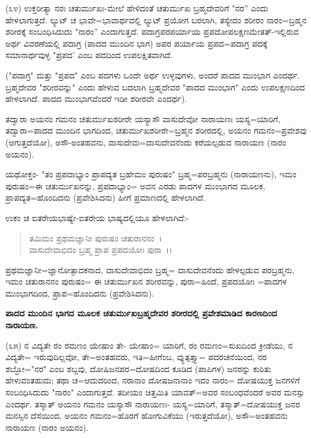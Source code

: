 (೩೪) ಉಕ್ತರೀತ್ಯಾ ನರಃ ಚತುರ್ಮುಖಃ-ಮೇಲೆ ಹೇಳಿದಂತೆ ಚತುರ್ಮುಖ ಬ್ರಹ್ಮದೇವರಿಗೆ "ನರ'' ಎಂದು ಹೇಳಲಾಗುತ್ತದೆ. ಲ್ಯುಟ್ ಚ ಭಾವೇ=ಭಾವಾರ್ಥದಲ್ಲಿ ಲ್ಯುಟ್ ಪ್ರಯೋಗ ಬರಲಾಗಿ, ತಸ್ಯೇದಂ ಶರೀರಂ ನಾರಂ=ಬ್ರಹ್ಮನ ಶರೀರಕ್ಕೆ ಸಂಬಂಧಿಸಿದುದು "ನಾರಂ'' ಎಂದಾಗುತ್ತದೆ. ಪದಾಗ್ರಪರಪರ್ಯಾಯ ಪ್ರಪದೋಪಲಕ್ಷಣಮೇತತ್-ಇಲ್ಲಿರುವ ಅರ್ಥ ವಿವರಣೆಯಲ್ಲಿ ಪದಾಗ್ರ (ಪಾದದ ಮುಂದಿನ ಭಾಗ) ಅಪರ ಪರ್ಯಾಯ ಪ್ರಪದ=ಪದಾಗ್ರ ಪದಕ್ಕೆ ಸಮಾನಾರ್ಥವುಳ್ಳ "ಪ್ರಪದ' ಎಂಬ ಪದದಿಂದ ಉಪಲಕ್ಷಿತವಾಗಿದೆ.

("ಪದಾಗ್ರ" ಮತ್ತು "ಪ್ರಪದ" ಎಂಬ ಪದಗಳು ಒಂದೇ ಅರ್ಥ ಉಳ್ಳವುಗಳು, ಅಂದರೆ ಪಾದದ ಮುಂಭಾಗ ಎಂದರ್ಥ. ಬ್ರಹ್ಮದೇವರ "ಶರೀರವನ್ನು" ಎಂದು ಹೇಳುವ ಬದಲಾಗಿ ಬ್ರಹ್ಮದೇವರ "ಪಾದದ ಮುಂಭಾಗ" ಎಂದು ಉಪಲಕ್ಷಣದಿಂದ ಹೇಳಲಾಗಿದೆ. ಪಾದದ ಮುಂಭಾಗವೆಂದರೆ ಇಡೀ ಶರೀರವೇ ಎಂದರ್ಥ).

ತದ್ವಾರಾ ಅಯನಂ ಗಮನಂ ಚತುರ್ಮುಖಶರೀರೇ ಯಸ್ಯಾಸೌ ವಾಸುದೇವೋ ನಾರಾಯಣಃ ಯಸ್ಯ=ಯಾರಿಗೆ, ತದ್ವಾರಾ=ಪಾದದ ಮುಂದಿನ ಭಾಗದಿಂದ, ಚತುರ್ಮುಖಶರೀರೇ=ಬ್ರಹ್ಮನ ಶರೀರದಲ್ಲಿ, ಅಯನಂ ಗಮನಂ=ಪ್ರವೇಶವು (ಆಗುತ್ತದೆಯೋ), ಅಸೌ-ಅಂತಹವನು, ವಾಸುದೇವಃ=ವಾಸುದೇವನೆಂದು ಕರೆಯಲ್ಪಡುವ ನಾರಾಯಣ (ನಾರಂ ಅಯನಂ).

ಯಥೋಕ್ತಂ- "ತಂ ಪ್ರಪದಾಭ್ಯಾಂ ಪ್ರಾಪದ್ಯತ ಬ್ರಹೇಮಂ ಪುರುಷಂ" ಬ್ರಹ್ಮ=ಪರಬ್ರಹ್ಮನು (ನಾರಾಯಣನು), ಇಮಂ ಪುರುಷಂ=ಈ ಚತುರ್ಮುಖನನ್ನು, ಪ್ರಪದಾಭ್ಯಾಂ= ಅವನ ಎರಡು ಪಾದಗಳ ಮುಂಭಾಗದ ಮೂಲಕ, ಪ್ರಾಪದ್ಯತ=ಹೊಂದಿದನು (ಪ್ರವೇಶಿಸಿದನು) ಹೀಗೆ ಪ್ರಮಾಣದಲ್ಲಿ ಹೇಳಲಾಗಿದೆ.

ಉಕಂ ಚ ಐತರೇಯಭಾಷ್ಯೇ-ಐತರೇಯ ಭಾಷ್ಯದಲ್ಲಿಯೂ ಹೇಳಲಾಗಿದೆ:-

\begin{verse}
ತಮಿಮಂ ಪ್ರಥಮಜ್ಞಾನೀ ಪುರುಷಂ ಚತುರಾನನಂ~।\\ ವಾಸುದೇವಾಭಿದಂ ಬ್ರಹ್ಮ ಪ್ರಾಪ ಪ್ರಪದಯೋಃ ಪುರಾ~।।
\end{verse}

ಪ್ರಥಮಜ್ಞಾನೀ=ಜ್ಞಾನೋತ್ಪಾದಕನಾದ, ವಾಸುದೇವಾಭಿದಂ ಬ್ರಹ್ಮ= ವಾಸುದೇವನೆಂದು ಹೇಳಲ್ಪಡುವ ಪರಬ್ರಹ್ಮನು, ಇಮಂ ಚತುರಾನನಂ ಪುರುಷಂ= ಈ ಚತುರ್ಮುಖನ ಶರೀರವನ್ನು, ಪುರಾ=ಹಿಂದೆ, ಪ್ರಪದಯೋಃ =ಪಾದಗಳ ಮುಂಭಾಗದಿಂದ, ಪ್ರಾಪ=ಹೊಂದಿದನು (ಪ್ರವೇಶಿಸಿದನು).

\begin{center}
\textbf{ಪಾದದ ಮುಂದಿನ ಭಾಗದ ಮೂಲಕ ಚತುರ್ಮುಖಬ್ರಹ್ಮದೇವರ ಶರೀರದಲ್ಲಿ ಪ್ರವೇಶಮಾಡಿದ ಕಾರಣದಿಂದ ನಾರಾಯಣ.}
\end{center}

(೩೫) ನ ವಿದ್ಯತೇ ರಂ ರಮಣಂ ಯೇಷಾಂ ತೇ- ಯೇಷಾಂ= ಯಾರಿಗೆ, ರಂ ರಮಣಂ=ಸುಖದಿಂದ ಕ್ರೀಡೆಯು, ನ ವಿದ್ಯತೇ= ಇರುವುದಿಲ್ಲವೋ, ತೇ=ಅಂತಹವರು, ಇತಿ=ಹೀಗೆಂಬ, ವ್ಯುತ್ಪತ್ತ್ಯಾ= ಪದರಚನೆಯಿಂದ, ನರ ಶಬ್ದೋ="ನರ" ಎಂಬ ಶಬ್ದವು, ದೋಷಿಜನಪರ=ದೋಷದಿಂದ ಕೂಡಿದ (ಪಾಪಿಗಳ) ಜನರನ್ನು ಕುರಿತು ಹೇಳುವಂತಹುದು; ತಥಾ ಚ=ಆದುದರಿಂದ, ನರಾನಾಂ ದೋಷಜನಾನಾಂ ಇದಂ ನಾರಂ= ದೋಷಯುಕ್ತ ಜನಗಳಿಗೆ ಸಂಬಂಧಿಸಿದುದು "ನಾರಂ" ಎಂದಾಗುತ್ತದೆ. ತದೀಯಂ ಚಿತ್ತಮಿತಿ ಯಾವತ್=ಅವರ ಸಂಬಂಧವೆಂದರೆ ಅವರ ಮನಸ್ಸು ಎಂದರ್ಥ. ತಸ್ಮಾತ್ ಅಯನಂ ಗಮನಂ ಯಸ್ಯಾಸೌ ನಾರಾಯಣಃ- ಯಸ್ಯ=ಯಾರಿಗೆ, ತಸ್ಮಾತ್=ದೋಷಯುಕ್ತ ಜನರ ಮನಸ್ಸಿನ ದೆಸೆಯಿಂದ, ಅಯನಂ ಗಮನಂ=ಹೊರಗೆ ಹೋಗುವಿಕೆಯು (ಇರುತ್ತದೆಯೋ), ಅಸೌ=ಅಂತಹವನು ನಾರಾಯಣ (ನಾರಂ ಅಯನಂ).

